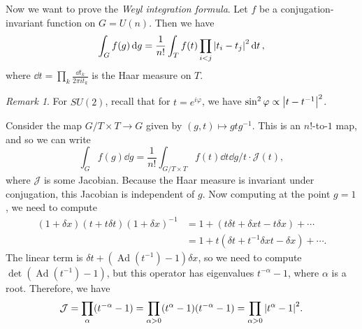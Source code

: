 \documentclass[leqno, openany]{memoir}
\theoremstyle{definition}
\theoremstyle{remark}
\newtheorem{rmk}[thm]{Remark}
\theoremstyle{plain}
\theoremstyle{definition}
\theoremstyle{remark}
\newcommand{\mc}[1]{\mathcal{#1}}
\DeclareMathOperator{\Ad}{Ad}
\begin{document}
Now we want to prove the \textit{Weyl integration formula}. Let $f$ be a conjugation-invariant function on $G = U(n)$. Then we have
\[ \int_G f(g) \dd{g} = \frac{1}{n!} \int_T f(t) \prod_{i < j} \abs{t_i - t_j}^2 \dd{t}, \]
where $\dd{t} = \prod_k \frac{\dd{t}_k}{2 \pi i t_k}$ is the Haar measure on $T$.

\begin{rmk}
    For $SU(2)$, recall that for $t = e^{i \varphi}$, we have $\sin^2 \varphi \propto \abs{t-t^{-1}}^2$.
\end{rmk}

Consider the map $G/T \times T \to G$ given by $(g,t) \mapsto gtg^{-1}$. This is an $n!$-to-$1$ map, and so we can write
\[ \int_G f(g) \dd{g} = \frac{1}{n!} \int_{G/T \times T} f(t) \dd{t} \dd{g/t} \cdot \mc{J}(t), \]
where $\mc{J}$ is some Jacobian. Because the Haar measure is invariant under conjugation, this Jacobian is independent of $g$. Now computing at the point $g = 1$, we need to compute
\begin{align*}
    (1+\delta x)(t + t \delta t)(1+\delta x)^{-1} &= 1 + (t \delta t + \delta x t - t \delta x) + \cdots \\
                                                  &= 1 + t(\delta t + t^{-1} \delta x t - \delta x) + \cdots.
\end{align*}
The linear term is $\delta t + (\Ad(t^{-1}) - 1) \delta x$, so we need to compute $\det (\Ad(t^{-1}) - 1)$, but this operator has eigenvalues $t^{-\alpha} - 1$, where $\alpha$ is a root. Therefore, we have
\[ \mc{J} = \prod_{\alpha}(t^{-\alpha} - 1) = \prod_{\alpha > 0} (t^{\alpha}-1)(t^{-\alpha}-1) = \prod_{\alpha > 0} \abs{t^{\alpha}-1}^2. \]
\end{document}
